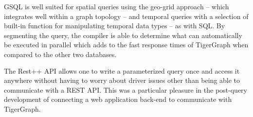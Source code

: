 GSQL is well suited for spatial queries using the geo-grid approach -- which integrates well within a graph topology -- and temporal queries with a selection of built-in function for manipulating temporal data types -- as with SQL. By segmenting the query, the compiler is able to determine what can automatically be executed in parallel which adds to the fast response times of TigerGraph when compared to the other two databases.

The Rest++ API allows one to write a parameterized query once and access it anywhere without having to worry about driver issues other than being able to communicate with a REST API. This was a particular pleasure in the post-query development of connecting a web application back-end to communicate with TigerGraph.
